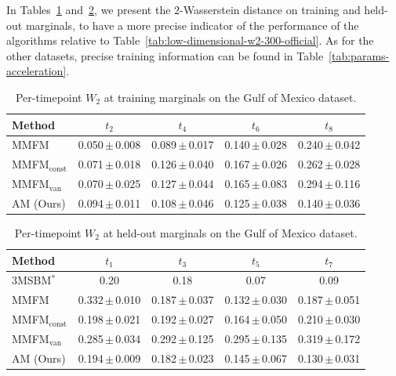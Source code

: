 \documentclass[12pt]{article}
\theoremstyle{plain}
\theoremstyle{plain}
\theoremstyle{remark}
\newcommand{\1}{\bm{1}}
\providecommand{\wentry}[2]{#1\,{\color{stdgray}$\pm$\,#2}}
\theoremstyle{plain}
\theoremstyle{definition}
\theoremstyle{remark}
\begin{document}
In Tables~\ref{tab:gom-training-marginals} and~\ref{tab:gom-eval-marginals}, we present the $2$-Wasserstein distance on training and held-out marginals, to have a more precise indicator of the performance of the algorithms relative to Table~\ref{tab:low-dimensional-w2-300-official}. As for the other datasets, precise training information can be found in Table~\ref{tab:params-acceleration}.

\begin{table}[t]
\centering
\caption{Per-timepoint $W_2$ at training marginals on the Gulf of Mexico dataset.}
\label{tab:gom-training-marginals}
\begin{tabular}{lcccc}
Method & $t_2$ & $t_4$ & $t_6$ & $t_8$ \\
\midrule
MMFM & \wentry{0.050}{0.008} & \wentry{0.089}{0.017} & \wentry{0.140}{0.028} & \wentry{0.240}{0.042} \\
MMFM$_{\mathrm{const}}$ & \wentry{0.071}{0.018} & \wentry{0.126}{0.040} & \wentry{0.167}{0.026} & \wentry{0.262}{0.028} \\
MMFM$_{\mathrm{van}}$ & \wentry{0.070}{0.025} & \wentry{0.127}{0.044} & \wentry{0.165}{0.083} & \wentry{0.294}{0.116} \\
\midrule
AM (Ours) & \wentry{0.094}{0.011} & \wentry{0.108}{0.046} & \wentry{0.125}{0.038} & \wentry{0.140}{0.036} \\
\end{tabular}
\end{table}

\begin{table}[t]
\centering
\caption{Per-timepoint $W_2$ at held-out marginals on the Gulf of Mexico dataset.}
\label{tab:gom-eval-marginals}
\begin{tabular}{lcccc}
Method & $t_1$ & $t_3$ & $t_5$ & $t_7$ \\
\midrule
3MSBM$^*$ & 0.20 & 0.18 & 0.07 & 0.09 \\
MMFM & \wentry{0.332}{0.010} & \wentry{0.187}{0.037} & \wentry{0.132}{0.030} & \wentry{0.187}{0.051} \\
\midrule
MMFM$_{\mathrm{const}}$ & \wentry{0.198}{0.021} & \wentry{0.192}{0.027} & \wentry{0.164}{0.050} & \wentry{0.210}{0.030} \\
MMFM$_{\mathrm{van}}$ & \wentry{0.285}{0.034} & \wentry{0.292}{0.125} & \wentry{0.295}{0.135} & \wentry{0.319}{0.172} \\
\midrule
AM (Ours) & \wentry{0.194}{0.009} & \wentry{0.182}{0.023} & \wentry{0.145}{0.067} & \wentry{0.130}{0.031} \\
\end{tabular}
\end{table}
\end{document}
